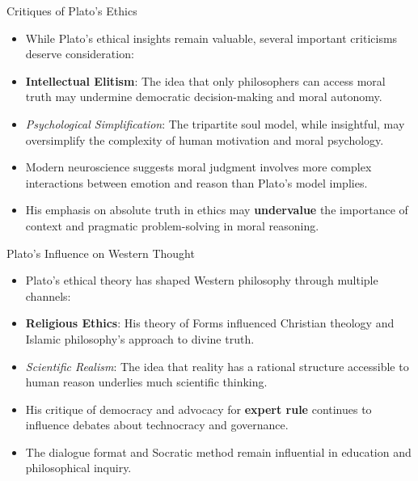 \documentclass[aspectratio=169]{beamer}
\begin{document}
\begin{frame}{Critiques of Plato's Ethics}
\begin{itemize}
\item While Plato's ethical insights remain valuable, several important criticisms deserve consideration:
\item \textbf{Intellectual Elitism}: The idea that only philosophers can access moral truth may undermine democratic decision-making and moral autonomy.
\item \emph{Psychological Simplification}: The tripartite soul model, while insightful, may oversimplify the complexity of human motivation and moral psychology.
\item Modern neuroscience suggests moral judgment involves more complex interactions between emotion and reason than Plato's model implies.
\item His emphasis on absolute truth in ethics may \textbf{undervalue} the importance of context and pragmatic problem-solving in moral reasoning.
\end{itemize}
\end{frame}

\begin{frame}{Plato's Influence on Western Thought}
\begin{itemize}
\item Plato's ethical theory has shaped Western philosophy through multiple channels:
\item \textbf{Religious Ethics}: His theory of Forms influenced Christian theology and Islamic philosophy's approach to divine truth.
\item \emph{Scientific Realism}: The idea that reality has a rational structure accessible to human reason underlies much scientific thinking.
\item His critique of democracy and advocacy for \textbf{expert rule} continues to influence debates about technocracy and governance.
\item The dialogue format and Socratic method remain influential in education and philosophical inquiry.
\end{itemize}
\end{frame}
\end{document}
